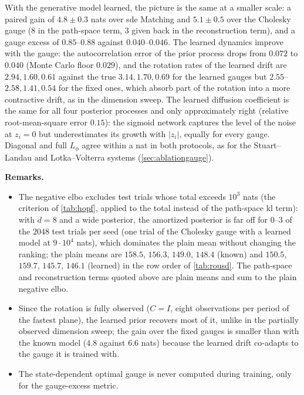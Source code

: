 \documentclass{article} %
\begin{document}
With the generative model learned, the picture is the same at a smaller scale: a paired gain of $4.8 \pm 0.3$ nats over \gls{sde} Matching and $5.1 \pm 0.5$ over the Cholesky gauge ($8$ in the path-space term, $3$ given back in the reconstruction term), and a gauge excess of $0.85$--$0.88$ against $0.040$--$0.046$. The learned dynamics improve with the gauge: the autocorrelation error of the prior process drops from $0.072$ to $0.040$ (Monte Carlo floor $0.029$), and the rotation rates of the learned drift are $2.94, 1.60, 0.61$ against the true $3.14, 1.70, 0.69$ for the learned gauges but $2.55$--$2.58, 1.41, 0.54$ for the fixed ones, which absorb part of the rotation into a more contractive drift, as in the dimension sweep. The learned diffusion coefficient is the same for all four posterior processes and only approximately right (relative root-mean-square error $0.15$): the sigmoid network captures the level of the noise at $z_i = 0$ but underestimates its growth with $|z_i|$, equally for every gauge. Diagonal and full $L_\phi$ agree within a nat in both protocols, as for the Stuart--Landau and Lotka--Volterra systems (\cref{sec:ablationgauge}).

\textbf{Remarks.}
\begin{itemize}[nosep,leftmargin=*]
    \item The negative \gls{elbo} excludes test trials whose total exceeds $10^3$ nats (the criterion of \cref{tab:hopf}, applied to the total instead of the path-space \gls{kl} term): with $d = 8$ and a wide posterior, the amortized posterior is far off for $0$--$3$ of the $2048$ test trials per seed (one trial of the Cholesky gauge with a learned model at $9 \cdot 10^4$ nats), which dominates the plain mean without changing the ranking; the plain means are $158.5$, $156.3$, $149.0$, $148.4$ (known) and $150.5$, $159.7$, $145.7$, $146.1$ (learned) in the row order of \cref{tab:rousd}. The path-space and reconstruction terms quoted above are plain means and sum to the plain negative \gls{elbo}.
    \item Since the rotation is fully observed ($C = I$, eight observations per period of the fastest plane), the learned prior recovers most of it, unlike in the partially observed dimension sweep; the gain over the fixed gauges is smaller than with the known model ($4.8$ against $6.6$ nats) because the learned drift co-adapts to the gauge it is trained with.
    \item The state-dependent optimal gauge is never computed during training, only for the gauge-excess metric.
\end{itemize}
\end{document}
